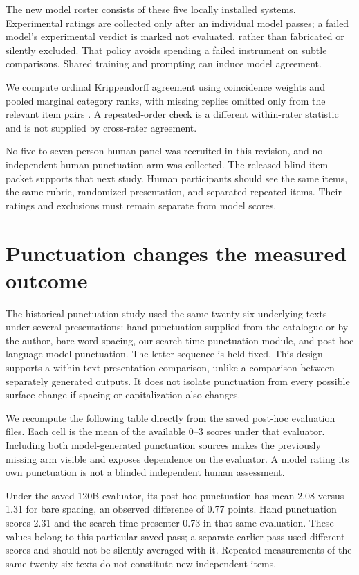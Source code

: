 \documentclass[11pt,letterpaper]{article}
\newcommand{\pageend}{\clearpage}
\begin{document}
The new model roster consists of these five locally installed systems. Experimental ratings are collected only after an individual model passes; a failed model's experimental verdict is marked not evaluated, rather than fabricated or silently excluded. That policy avoids spending a failed instrument on subtle comparisons. Shared training and prompting can induce model agreement.

We compute ordinal Krippendorff agreement using coincidence weights and pooled marginal category ranks, with missing replies omitted only from the relevant item pairs \citep{krippendorff2011computing}. A repeated-order check is a different within-rater statistic and is not supplied by cross-rater agreement.



No five-to-seven-person human panel was recruited in this revision, and no independent human punctuation arm was collected. The released blind item packet supports that next study. Human participants should see the same items, the same rubric, randomized presentation, and separated repeated items. Their ratings and exclusions must remain separate from model scores.
\pageend

\section{Punctuation changes the measured outcome}
\label{sec:punct}
The historical punctuation study used the same twenty-six underlying texts under several presentations: hand punctuation supplied from the catalogue or by the author, bare word spacing, our search-time punctuation module, and post-hoc language-model punctuation. The letter sequence is held fixed. This design supports a within-text presentation comparison, unlike a comparison between separately generated outputs. It does not isolate punctuation from every possible surface change if spacing or capitalization also changes.

We recompute the following table directly from the saved post-hoc evaluation files. Each cell is the mean of the available 0--3 scores under that evaluator. Including both model-generated punctuation sources makes the previously missing arm visible and exposes dependence on the evaluator. A model rating its own punctuation is not a blinded independent human assessment.



Under the saved 120B evaluator, its post-hoc punctuation has mean 2.08 versus 1.31 for bare spacing, an observed difference of 0.77 points. Hand punctuation scores 2.31 and the search-time presenter 0.73 in that same evaluation. These values belong to this particular saved pass; a separate earlier pass used different scores and should not be silently averaged with it. Repeated measurements of the same twenty-six texts do not constitute new independent items.
\end{document}
